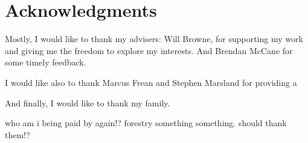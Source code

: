 \chapter*{Acknowledgments}\label{C:ack}

Mostly, I would like to thank my advisers: Will Browne, for supporting my work and giving me the freedom to explore my interests.
And Brendan McCane for some timely feedback.

I would like also to thank Marcus Frean and Stephen Marsland for providing a

And finally, I would like to thank my family.

{\color{red}who am i being paid by again!? forestry something something. should thank them!?}

